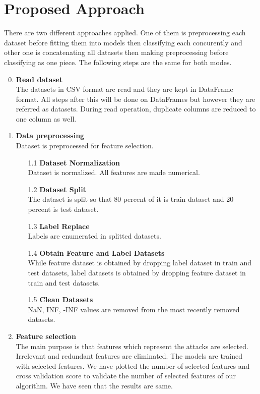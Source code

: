 \documentclass[submission,copyright,creativecommons]{eptcs}
\begin{document}
\section{Proposed Approach}
There are two different approaches applied. One of them is preprocessing each dataset before fitting them into models then classifying each concurently and other one is concatenating all datasets then making preprocessing before classifying as one piece.
The following steps are the same for both modes.
\begin{enumerate}
\setcounter{enumi}{-1}
\item \textbf{Read dataset}\\
The datasets in CSV format are read and they are kept in DataFrame format. All steps after this will be done on DataFrames but however they are referred as datasets. During read operation, duplicate columns are reduced to one column as well.
\item \textbf{Data preprocessing}\\
Dataset is preprocessed for feature selection.
\begin{enumerate}
    \item[1.1] \textbf{Dataset Normalization}\\
    Dataset is normalized. All features are made numerical.
    \item[1.2] \textbf{Dataset Split}\\
    The dataset is split so that 80 percent of it is train dataset and 20 percent is test dataset. 
    \item[1.3] \textbf{Label Replace}\\
    Labels are enumerated in splitted datasets.
    \item[1.4] \textbf{Obtain Feature and Label Datasets}\\
    While feature dataset is obtained by dropping label dataset in train and test datasets, label datasets is obtained by dropping feature dataset in train and test datasets.
    \item[1.5] \textbf{Clean Datasets}\\
    NaN, INF, -INF values are removed from the most recently removed datasets.
\end{enumerate}
\newpage
\item \textbf{Feature selection}\\
The main purpose is that features which represent the attacks are selected. Irrelevant and redundant features are eliminated. The models are trained with selected features. We have plotted the number of selected features and cross validation score to validate the number of selected features of our algorithm. We have seen that the results are same.

\end{enumerate}
\end{document}
